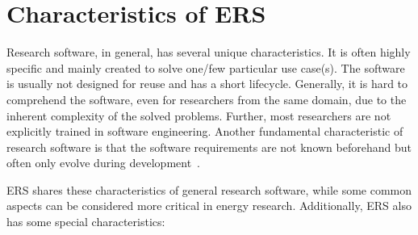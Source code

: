 \section{Characteristics of ERS} \label{sec:chara}

Research software, in general, has several unique characteristics. It is often highly specific and mainly created to solve one/few particular use case(s). The software is usually not designed for reuse and has a short lifecycle. Generally, it is hard to comprehend the software, even for researchers from the same domain, due to the inherent complexity of the solved problems. Further, most researchers are not explicitly trained in software engineering. Another fundamental characteristic of research software is that the software requirements are not known beforehand but often only evolve during development~\cite{hasselbring_toward_2024,felderer_investigating_2025}. 

\ac{ERS} shares these characteristics of general research software, while some common aspects can be considered more critical in energy research. Additionally, \ac{ERS} also has some special characteristics:


